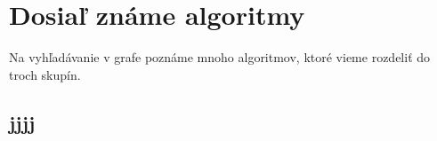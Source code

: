 \chapter{Dosiaľ známe algoritmy}
Na vyhľadávanie v grafe poznáme mnoho algoritmov, ktoré vieme rozdeliť do troch skupín.
\section{jjjj}




